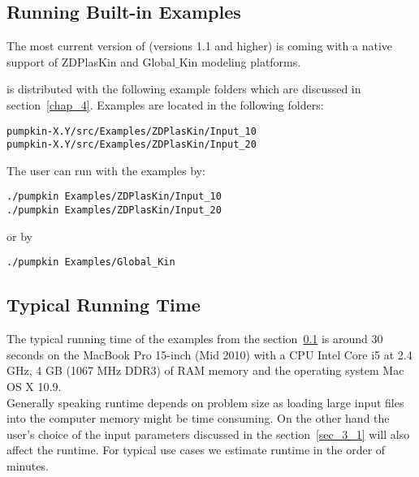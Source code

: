 
\subsection{Running Built-in Examples}
\label{sec_2_1_4}
The most current version of \pump{} (versions 1.1 and higher) is coming with a native support of ZDPlasKin and Global$\_$Kin modeling platforms.

\pump{} is distributed with the following example folders which are discussed in section~\ref{chap_4}. Examples are located in the following folders:
\begin{display}
\begin{verbatim}
pumpkin-X.Y/src/Examples/ZDPlasKin/Input_10
pumpkin-X.Y/src/Examples/ZDPlasKin/Input_20
\end{verbatim}
\end{display}
The user can run \pump{} with the examples by:
\begin{display}
\begin{verbatim}
./pumpkin Examples/ZDPlasKin/Input_10
./pumpkin Examples/ZDPlasKin/Input_20
\end{verbatim}
\end{display}
or by
\begin{display}
\begin{verbatim}
./pumpkin Examples/Global_Kin
\end{verbatim}
\end{display}


\subsection{Typical Running Time}
\label{sec_2_1_5}
The typical running time of the examples from the section~\ref{sec_2_1_4} is around 30 seconds on the MacBook Pro 15-inch (Mid 2010) with a CPU Intel Core i5 at 2.4 GHz, 4 GB (1067 MHz DDR3) of RAM memory and the operating system Mac OS X 10.9. 
\\ Generally speaking \pump{} runtime depends on problem size as loading large input files into the computer memory might be time consuming. On the other hand the user's choice of the input parameters discussed in the section~\ref{sec_3_1} will also affect the runtime. For typical use cases we estimate runtime in the order of minutes. 















